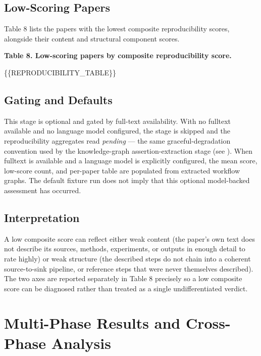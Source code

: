 \documentclass[
]{article}
\begin{document}
\subsection{Low-Scoring Papers}\label{low-scoring-papers}

Table 8 lists the papers with the lowest composite reproducibility
scores, alongside their content and structural component scores.

\textbf{Table 8. Low-scoring papers by composite reproducibility score.}

\{\{REPRODUCIBILITY\_TABLE\}\}

\subsection{Gating and Defaults}\label{gating-and-defaults-1}

This stage is optional and gated by full-text availability. With no
fulltext available and no language model configured, the stage is
skipped and the reproducibility aggregates read \emph{pending} --- the
same graceful-degradation convention used by the knowledge-graph
assertion-extraction stage (see
\href{02d_methods_knowledge_graph.md}{}).
When fulltext is available and a language model is explicitly
configured, the mean score, low-score count, and per-paper table are
populated from extracted workflow graphs. The default fixture run does
not imply that this optional model-backed assessment has occurred.

\subsection{Interpretation}\label{interpretation}

A low composite score can reflect either weak content (the paper's own
text does not describe its sources, methods, experiments, or outputs in
enough detail to rate highly) or weak structure (the described steps do
not chain into a coherent source-to-sink pipeline, or reference steps
that were never themselves described). The two axes are reported
separately in Table 8 precisely so a low composite score can be
diagnosed rather than treated as a single undifferentiated verdict.

\newpage

\section{Multi-Phase Results and Cross-Phase
Analysis}\label{multi-phase-results-and-cross-phase-analysis}
\end{document}
